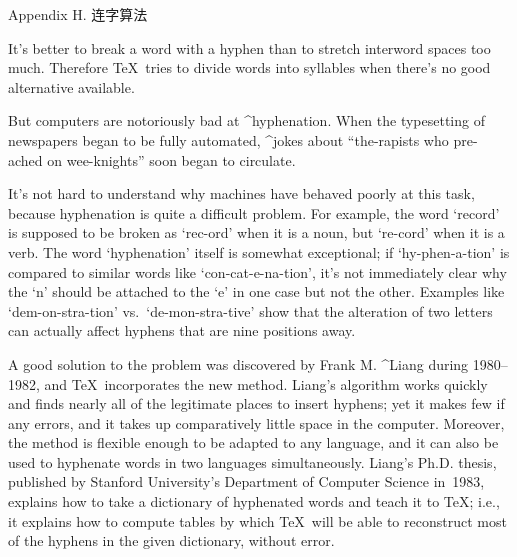 


\beginappendix Appendix H. 连字算法

It's better to break a word with a hyphen than to stretch interword spaces
too much. Therefore \TeX\ tries to divide words into syllables when
there's no good alternative available.

But computers are notoriously bad at ^{hyphenation}. When the type\-setting of
newspapers began to be fully automated, ^{jokes} about ``the-rapists who
pre-ached on wee-knights'' soon began to circulate.

It's not hard to understand why machines have behaved poorly at this task,
because hyphenation is quite a difficult problem. For example, the word
`record' is supposed to be broken as `rec-ord' when it is a noun, but
`re-cord' when it is a verb. The word `hyphenation' itself is somewhat
exceptional; if `hy-phen-a-tion' is compared to similar words like
`con-cat-e-na-tion', it's not immediately clear why the `n' should
be attached to the `e' in one case but not the other. Examples like
`dem-on-stra-tion' vs.~`de-mon-stra-tive' show that the alteration of
two letters can actually affect hyphens that are nine positions away.

A good solution to the problem was discovered by Frank M. ^{Liang} during
1980--1982, and \TeX\ incorporates the new method. Liang's algorithm
works quickly and finds nearly all of the legitimate places to insert
hyphens; yet it makes few if any errors, and it takes up comparatively
little space in the computer. Moreover, the method is flexible enough
to be adapted to any language, and it can also be used to hyphenate
words in two languages simultaneously. Liang's Ph.D. thesis,
published by Stanford University's Department of Computer Science in~1983,
explains how to take a dictionary of hyphenated words and teach it to \TeX;
i.e., it explains how to compute tables by which \TeX\ will be able to
reconstruct most of the hyphens in the given dictionary, without error.

